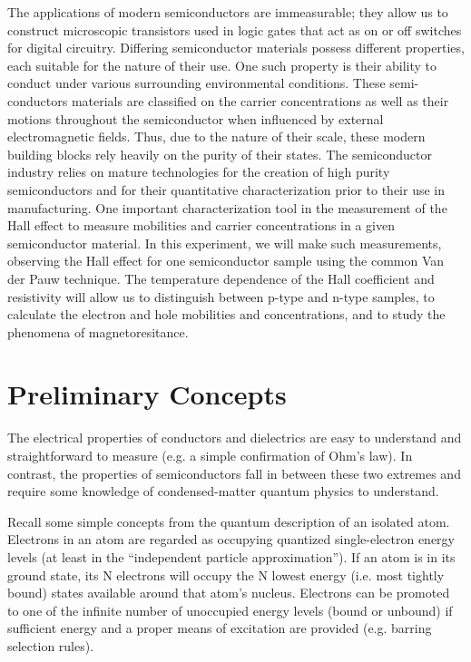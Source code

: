\documentclass{../lab}
\begin{document}
The applications of modern semiconductors are immeasurable; they allow us to construct microscopic transistors used in logic gates that act as on or off switches for digital circuitry. Differing semiconductor materials possess different properties, each suitable for the nature of their use. One such property is their ability to conduct under various surrounding environmental conditions. These semi-conductors materials are classified on the carrier concentrations as well as their motions throughout the semiconductor when influenced by external electromagnetic fields. Thus, due to the nature of their scale, these modern building blocks rely heavily on the purity of their states. The semiconductor industry relies on mature technologies for the creation of high purity semiconductors and for their quantitative characterization prior to their use in manufacturing. One important characterization tool in the measurement of the Hall effect to measure mobilities and carrier concentrations in a given semiconductor material. In this experiment, we will make such measurements, observing the Hall effect for one semiconductor sample using the common Van der Pauw technique. The temperature dependence of the Hall coefficient and resistivity will allow us to distinguish between p-type and n-type samples, to calculate the electron and hole mobilities and concentrations, and to study the phenomena of magnetoresitance.

\section{Preliminary Concepts}

The electrical properties of conductors and dielectrics are easy to understand and straightforward to measure (e.g. a simple confirmation of Ohm's law). In contrast, the properties of semiconductors fall in between these two extremes and require some knowledge of condensed-matter quantum physics to understand.

Recall some simple concepts from the quantum description of an isolated atom. Electrons in an atom are regarded as occupying quantized single-electron energy levels (at least in the ``independent particle approximation''). If an atom is in its ground state, its N electrons will occupy the N lowest energy (i.e. most tightly bound) states available around that atom's nucleus. Electrons can be promoted to one of the infinite number of unoccupied energy levels (bound or unbound) if sufficient energy and a proper means of excitation are provided (e.g. barring selection rules).
\end{document}
